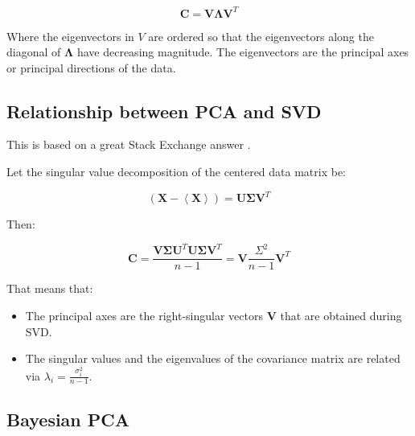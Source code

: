 \begin{equation}
\mathbf{C} = \mathbf{V}\mathbf{\Lambda}\mathbf{V}^T
\end{equation}

Where the eigenvectors in $V$ are ordered so that the eigenvectors along the diagonal of $\mathbf{\Lambda}$ have decreasing magnitude. The eigenvectors are the principal axes or principal directions of the data.




\subsection{Relationship between PCA and SVD}
\label{sec:pcasvd}
This is based on a great Stack Exchange answer \cite{amoeba2015svdpca}.

Let the singular value decomposition of the centered data matrix be:

\begin{equation}
\left(\mathbf{X}-\left<\mathbf{X}\right>\right) = \mathbf{U}\mathbf{\Sigma}\mathbf{V}^T
\end{equation}

Then:

\begin{equation}
\mathbf{C} = \frac{\mathbf{V\Sigma U}^T\mathbf{U\Sigma V}^T}{n-1} = \mathbf{V}\frac{\Sigma^2}{n-1}\mathbf{V}^T
\end{equation}

That means that:

\begin{itemize}
\item The principal axes are the right-singular vectors $\mathbf{V}$ that are obtained during SVD.
\item The singular values and the eigenvalues of the covariance matrix are related via $\lambda_i = \frac{\sigma_i^2}{n-1}$.
\end{itemize}

\subsection{Bayesian PCA}